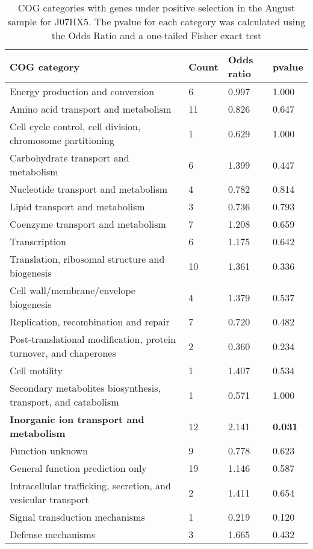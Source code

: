 \begin{table}[hb]
\footnotesize 
	\tabcolsep=0.11cm 
\caption{COG categories with genes under positive selection in the August sample for J07HX5. The pvalue for each category was calculated using the Odds Ratio and a one-tailed Fisher exact test \\} 
\begin{tabularx}{\textwidth}{L{6cm}R{2cm}R{2cm}R{2cm}} 
\hline 
\textbf{COG category} & \textbf{Count} & \textbf{Odds ratio} & \textbf{pvalue} \\ 
\hline 
Energy production and conversion & 6 & 0.997 & 1.000 \\ 
Amino acid transport and metabolism & 11 & 0.826 & 0.647 \\ 
Cell cycle control, cell division, chromosome partitioning & 1 & 0.629 & 1.000 \\ 
Carbohydrate transport and metabolism & 6 & 1.399 & 0.447 \\ 
Nucleotide transport and metabolism & 4 & 0.782 & 0.814 \\ 
Lipid transport and metabolism & 3 & 0.736 & 0.793 \\ 
Coenzyme transport and metabolism & 7 & 1.208 & 0.659 \\ 
Transcription & 6 & 1.175 & 0.642 \\ 
Translation, ribosomal structure and biogenesis & 10 & 1.361 & 0.336 \\ 
Cell wall/membrane/envelope biogenesis & 4 & 1.379 & 0.537 \\ 
Replication, recombination and repair & 7 & 0.720 & 0.482 \\ 
Post-translational modification, protein turnover, and chaperones & 2 & 0.360 & 0.234 \\ 
Cell motility & 1 & 1.407 & 0.534 \\ 
Secondary metabolites biosynthesis, transport, and catabolism & 1 & 0.571 & 1.000 \\ 
\textbf{Inorganic ion transport and metabolism} & 12 & 2.141 & \textbf{0.031} \\ 
Function unknown & 9 & 0.778 & 0.623 \\ 
General function prediction only & 19 & 1.146 & 0.587 \\ 
Intracellular trafficking, secretion, and vesicular transport & 2 & 1.411 & 0.654 \\ 
Signal transduction mechanisms & 1 & 0.219 & 0.120 \\ 
Defense mechanisms & 3 & 1.665 & 0.432 \\ 
\end{tabularx} 
\label{August_COG_Selection_J07HX5} 
 \end{table} 

